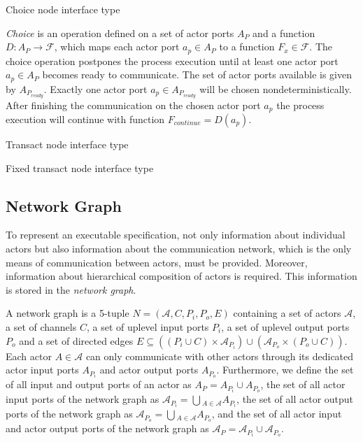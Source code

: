 \begin{definition}\label{choice-node-interface-type}
  Choice node interface type
  
  \emph{Choice} is an operation defined on a set of actor ports $A_{P}$
  and a function $D: A_{P} \to \mathcal{F}$, which maps each actor port
  $a_{p} \in A_{P}$ to a function $F_{x} \in \mathcal{F}$.
  The choice operation postpones the process execution 
  until at least one actor port $a_{p} \in A_{P}$
  becomes ready to communicate. The set of actor ports available
  is given by $A_{P_{ready}}$.
  Exactly one actor port $a_{p} \in A_{P_{ready}}$
  will be chosen nondeterministically. After
  finishing the communication on the chosen actor port $a_{p}$
  the process execution will continue
  with function $F_{continue} = D(a_{p})$.
\end{definition}

\begin{definition}\label{transact-node-interface-type}
  Transact node interface type
\end{definition}

\begin{definition}\label{fixed-transact-node-interface-type}
  Fixed transact node interface type
\end{definition}

\subsection{Network Graph}\label{network-graph} 

To represent an executable specification, not only information about
individual actors but also information about the communication network,
which is the only means of communication between actors,
must be provided. Moreover, information about hierarchical
composition of actors is required. This information is stored in
the \emph{network graph}.

\begin{definition}
A network graph is a 5-tuple $N=(\mathcal{A},C,P_{i},P_{o},E)$ containing
a set of actors $\mathcal{A}$, a set of channels $C$, a set of uplevel
input ports $P_{i}$, a set of uplevel output ports $P_{o}$ and a set of
directed edges $E \subseteq ((P_{i} \cup C) \times \mathcal{A}_{P_{i}})
\cup (\mathcal{A}_{P_{o}} \times (P_{o} \cup C))$.
Each actor $A \in \mathcal{A}$ can only communicate with other actors
through its dedicated actor input ports $A_{P_{i}}$ and
actor output ports $A_{P_{o}}$.
Furthermore, we define the set of all input and output ports of an actor
as $A_{P} = A_{P_{i}} \cup A_{P_{o}}$,
the set of all actor input ports of the network graph as
$\mathcal{A}_{P_{i}} = \bigcup{}_{A \in \mathcal{A}} A_{P_{i}}$,
the set of all actor output ports of the network graph as 
$\mathcal{A}_{P_{o}} = \bigcup{}_{A \in \mathcal{A}} A_{P_{o}}$,
and the set of all actor input and actor output ports of the network graph as
$\mathcal{A}_{P} = \mathcal{A}_{P_{i}} \cup \mathcal{A}_{P_{o}}$.

\end{definition}


